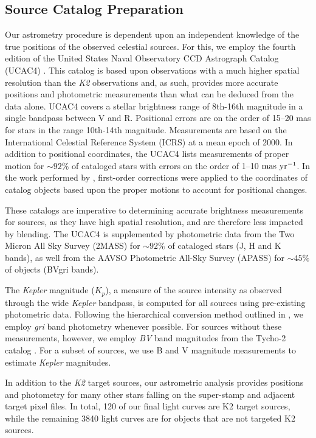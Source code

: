 \documentclass[apjl]{emulateapj}
\begin{document}
\subsection{Source Catalog Preparation}
\label{subsec:cat} 
Our astrometry procedure is dependent upon an independent knowledge of
the true positions of the observed celestial sources.  For this, we
employ the fourth edition of the United States Naval Observatory CCD
Astrograph Catalog (UCAC4) \citep{Zacharias:2013}. This catalog is based
upon observations with a much higher spatial resolution than the
\textit{K2} observations and, as such, provides more accurate positions
and photometric measurements than what can be deduced from the data
alone.  UCAC4 covers a stellar brightness range of 8th-16th magnitude in
a single bandpass between V and R.  Positional errors are on the order
of 15--20 mas for stars in the range 10th-14th magnitude.  Measurements
are based on the International Celestial Reference System (ICRS) at a
mean epoch of 2000.  In addition to positional coordinates, the UCAC4
lists measurements of proper motion for ${\sim}92\%$ of cataloged stars
with errors on the order of 1--10 $\rm mas \ yr^{-1}$.  In the work
performed by \citet{Huang:2015}, first-order corrections were applied to
the coordinates of catalog objects based upon the proper motions to
account for positional changes.

These catalogs are imperative to determining accurate brightness
measurements for sources, as they have high spatial resolution, 
and are therefore less impacted by blending.  The UCAC4 is supplemented
by photometric data from the Two Micron All Sky Survey (2MASS)
\citep{Skrutskie:2006} for ${\sim}92\%$ of cataloged stars (J, H and K
bands), as well from the AAVSO Photometric All-Sky Survey (APASS) for
$\sim 45\%$ of objects (BVgri bands).

The \textit{Kepler} magnitude ($K_{p}$), a measure of the source
intensity as observed through the wide \textit{Kepler} bandpass, is
computed for all sources using pre-existing photometric data.  Following
the hierarchical conversion method outlined in \citet{Brown:2011}, we
employ \textit{gri} band photometry whenever possible.  For sources
without these measurements, however, we employ \textit{BV} band
magnitudes from the Tycho-2 catalog \citep{Tycho:2000}.  For a subset of
sources, we use B and V magnitude measurements to estimate
\textit{Kepler} magnitudes.

In addition to the \textit{K2} target sources, our astrometric analysis
provides positions and photometry for many other stars falling on the
super-stamp and adjacent target pixel files. In total, 120 of our final
light curves are K2 target sources, while the remaining 3840 light
curves are for objects that are not targeted K2 sources.
\end{document}
